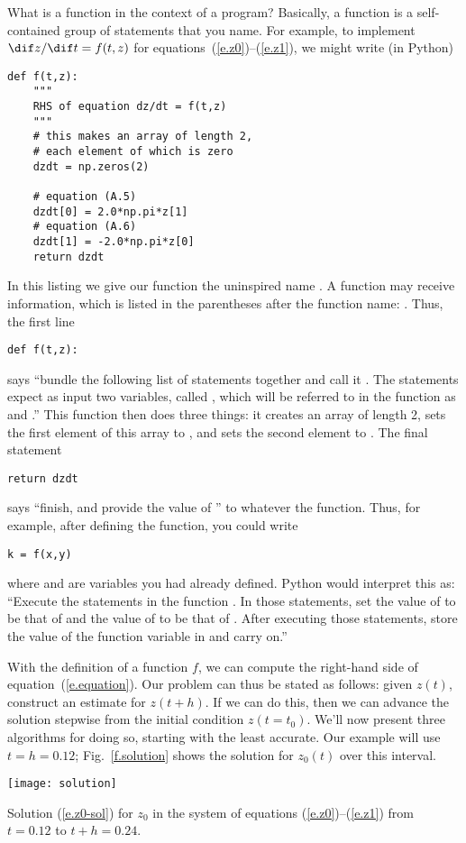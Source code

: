 \begin{sidebar}[Functions]
What is a function in the context of a program? Basically, a function is a self-contained group of statements that you name. For example, to implement $\dif z/\dif t = f(t,z)$ for equations~(\ref{e.z0})--(\ref{e.z1}), we might write (in Python)
\begin{Verbatim}[numbers=none]
def f(t,z):
    """
    RHS of equation dz/dt = f(t,z)
    """
    # this makes an array of length 2,
    # each element of which is zero
    dzdt = np.zeros(2)

    # equation (A.5)
    dzdt[0] = 2.0*np.pi*z[1]
    # equation (A.6)
    dzdt[1] = -2.0*np.pi*z[0]
    return dzdt
\end{Verbatim}
In this listing we give our function the uninspired name . A function may receive information, which is listed in the parentheses after the function name: . Thus, the first line
\begin{Verbatim}[numbers=none]
def f(t,z):
\end{Verbatim}
says ``bundle the following list of statements together and call it . The statements expect as input two variables, called , which will be referred to in the function as  and .''
This function then does three things: it creates an array  of length 2, sets the first element of this array to , and sets the second element to . The final statement
\begin{Verbatim}[numbers=none]
    return dzdt
\end{Verbatim}
says ``finish, and provide the value of '' to whatever  the function. Thus, for example, after defining the function, you could write
\begin{Verbatim}[numbers=none]
k = f(x,y)
\end{Verbatim}
where  and  are variables you had already defined.
Python would interpret this as: ``Execute the statements in the function . In those statements, set the value of  to be that of  and the value of  to be that of . After executing those statements, store the value of the function variable   in  and carry on.''
\end{sidebar}

With the definition of a function $f$, we can compute the right-hand side of equation~(\ref{e.equation}). Our problem can thus be stated as follows:
given $z(t)$, construct an estimate for $z(t+h)$. If we can do this, then we can advance the solution stepwise from the initial condition $z(t=t_{0})$. We'll now present three algorithms for doing so, starting with the least accurate. Our example will use $t=h=0.12$; Fig.~\ref{f.solution} shows the solution for $z_{0}(t)$ over this interval.
\begin{marginfigure}
\texttt{[image: solution]}
\caption[Solution for a sample set of ODE's]{\label{f.solution} Solution (\ref{e.z0-sol}) for $z_{0}$ in the system of equations (\ref{e.z0})--(\ref{e.z1}) from $t=0.12$ to $t+h=0.24$.}
\end{marginfigure}

